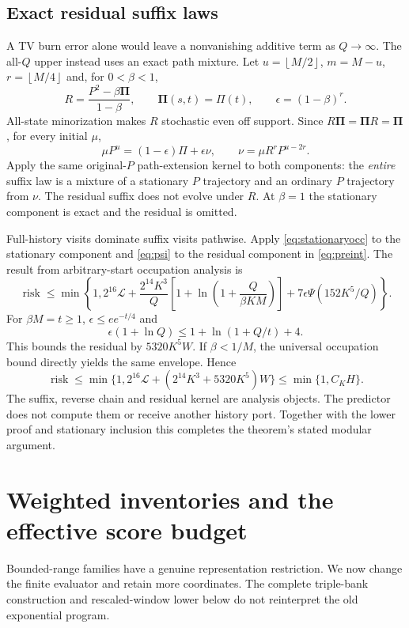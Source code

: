 \documentclass[11pt,letterpaper]{article}
\theoremstyle{definition}\newtheorem{definition}[theorem]{Definition}
\theoremstyle{remark}\newtheorem{remark}[theorem]{Remark}
\newcommand{\floor}[1]{\left\lfloor #1\right\rfloor}
\begin{document}
\subsection{Exact residual suffix laws}
A TV burn error alone would leave a nonvanishing additive term as $Q\to\infty$. The all-$Q$ upper instead uses an exact path mixture. Let $u=\floor{M/2}$, $m=M-u$, $r=\floor{M/4}$ and, for $0<\beta<1$,
\[
 R=\frac{P^2-\beta\mathbf\Pi}{1-\beta},\qquad
 \mathbf\Pi(s,t)=\Pi(t),\qquad \epsilon=(1-\beta)^r.
\]
All-state minorization makes $R$ stochastic even off support. Since $R\mathbf\Pi=\mathbf\Pi R=\mathbf\Pi$, for every initial $\mu$,
\begin{equation}\label{eq:mixture}
 \mu P^u=(1-\epsilon)\Pi+\epsilon\nu,
 \qquad \nu=\mu R^rP^{u-2r}.
\end{equation}
Apply the same original-$P$ path-extension kernel to both components: the \emph{entire} suffix law is a mixture of a stationary $P$ trajectory and an ordinary $P$ trajectory from $\nu$. The residual suffix does not evolve under $R$. At $\beta=1$ the stationary component is exact and the residual is omitted.

Full-history visits dominate suffix visits pathwise. Apply \eqref{eq:stationaryocc} to the stationary component and \eqref{eq:psi} to the residual component in \eqref{eq:preint}. The result from arbitrary-start occupation analysis is
\[
 \operatorname{risk}\le\min\left\{1,2^{16}\mathcal L+
 \frac{2^{14}K^3}{Q}\left[1+\ln\left(1+\frac Q{\beta KM}\right)\right]
 +7\epsilon\Psi(152K^5/Q)\right\}.
\]
For $\beta M=t\ge1$, $\epsilon\le e e^{-t/4}$ and
\[
 \epsilon(1+\ln Q)\le1+\ln(1+Q/t)+4.
\]
This bounds the residual by $5320K^5W$. If $\beta<1/M$, the universal occupation bound directly yields the same envelope. Hence
\[
 \operatorname{risk}\le\min\{1,2^{16}\mathcal L+(2^{14}K^3+5320K^5)W\}
 \le\min\{1,C_KH\}.
\]
The suffix, reverse chain and residual kernel are analysis objects. The predictor does not compute them or receive another history port. Together with the lower proof and stationary inclusion this completes the theorem's stated modular argument.

\section{Weighted inventories and the effective score budget}\label{sec:score}
Bounded-range families have a genuine representation restriction. We now change the finite evaluator and retain more coordinates. The complete triple-bank construction and rescaled-window lower below do not reinterpret the old exponential program.
\end{document}
